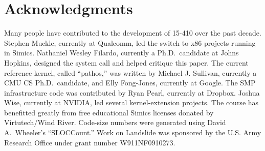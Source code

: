 

\section*{Acknowledgments}

Many people have contributed to the development of
15-410 over the past decade.
Stephen Muckle, currently at Qualcomm,
led the switch to x86 projects running in Simics.
Nathaniel Wesley Filardo,
currently a Ph.D.\ candidate at Johns Hopkins,
designed the  system call and helped critique this paper.
The current reference kernel, called ``pathos,''
was written by Michael J. Sullivan,
currently a CMU CS Ph.D.\ candidate,
and Elly Fong-Jones, currently at Google.
The SMP infrastructure code was contributed by
Ryan Pearl, currently at Dropbox.
Joshua Wise, currently at NVIDIA,
led several kernel-extension projects.
The course has benefitted
greatly from free educational Simics licenses
donated by Virtutech/Wind River.
Code-size numbers were generated using David A.\ Wheeler's
``SLOCCount.''
Work on Landslide was sponsored by the U.S. Army Research Office under grant number W911NF0910273.
